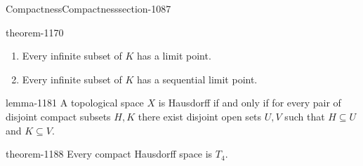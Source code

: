 \documentclass[oneside,10pt,]{article}
\begin{document}
\begin{sectionptx}{Compactness}{}{Compactness}{}{}{section-1087}
\begin{theorem}{}{}{theorem-1170}
\begin{enumerate}
\item\hypertarget{li-1177}{}Every infinite subset of \(K\) has a limit point.%
\item\hypertarget{li-1179}{}Every infinite subset of \(K\) has a sequential limit point.%
\end{enumerate}
\end{theorem}
\begin{lemma}{}{}{lemma-1181}%
\hypertarget{p-1182}{}%
A topological space \(X\) is Hausdorff if and only if for every pair of disjoint compact subsets \(H,K\) there exist disjoint open sets \(U,V\) such that \(H\subseteq U\) and \(K\subseteq V\).%
\end{lemma}
\begin{theorem}{}{}{theorem-1188}%
\hypertarget{p-1189}{}%
Every compact Hausdorff space is \(T_4\).%
\end{theorem}
\end{sectionptx}
%
%
\typeout{************************************************}
\typeout{************************************************}
%
\end{document}
